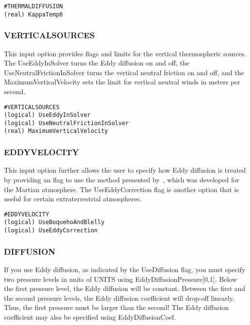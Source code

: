 \begin{verbatim}
#THERMALDIFFUSION
(real) KappaTemp0
\end{verbatim}

\subsubsection{VERTICALSOURCES}
\label{verticalsources.sec}

This input option provides flags and limits for the vertical thermospheric sources.  The UseEddyInSolver turns the Eddy diffusion on and off, the UseNeutralFrictionInSolver turns the vertical neutral friction on and off, and the MaximumVerticalVelocity sets the limit for vertical neutral winds in meters per second.

\begin{verbatim}
#VERTICALSOURCES
(logical) UseEddyInSolver             
(logical) UseNeutralFrictionInSolver  
(real) MaximumVerticalVelocity    
\end{verbatim}

\subsubsection{EDDYVELOCITY}
\label{eddyvelocity.sec}

This input option further allows the user to specify how Eddy diffusion is treated by providing an flag to use the method presented by~\citet{Boqueho:2005aa}, which was developed for the Martian atmosphere.  The UseEddyCorrection flag is another option that is useful for certain extraterrestrial atmospheres.

\begin{verbatim}
#EDDYVELOCITY
(logical) UseBoquehoAndBlelly 
(logical) UseEddyCorrection
\end{verbatim}

\subsubsection{DIFFUSION}
\label{diffusion.sec}

If you use Eddy diffusion, as indicated by the UseDiffusion flag, you must specify two pressure levels in units of UNITS using EddyDiffusionPressure[0,1].  Below the first pressure level, the Eddy diffusion will be constant.  Between the first and the second pressure levels, the Eddy diffusion coefficient will drop-off linearly.  Thus, the first pressure must be larger than the second!  The Eddy diffusion coefficient may also be specified using EddyDiffusionCoef.

